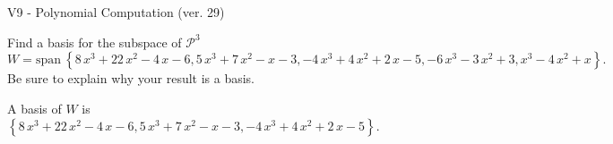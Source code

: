 \begin{exercise}
  \begin{exerciseTitle}V9 - Polynomial Computation (ver. 29)\end{exerciseTitle}
  \begin{exerciseStatement}
    Find a basis for the subspace of \(\mathcal{P}^3\) 
\[W=\mathrm{span}\ \left\{8 \, x^{3} + 22 \, x^{2} - 4 \, x - 6 , 5 \, x^{3} + 7 \, x^{2} - x - 3 , -4 \, x^{3} + 4 \, x^{2} + 2 \, x - 5 , -6 \, x^{3} - 3 \, x^{2} + 3 , x^{3} - 4 \, x^{2} + x\right\}.\]
 Be sure to explain why your result is a basis.


  \end{exerciseStatement}
  \begin{exerciseAnswer}
   A basis of \(W\) is  \(\left\{8 \, x^{3} + 22 \, x^{2} - 4 \, x - 6 , 5 \, x^{3} + 7 \, x^{2} - x - 3 , -4 \, x^{3} + 4 \, x^{2} + 2 \, x - 5\right\}\).
  


  \end{exerciseAnswer}
\end{exercise}